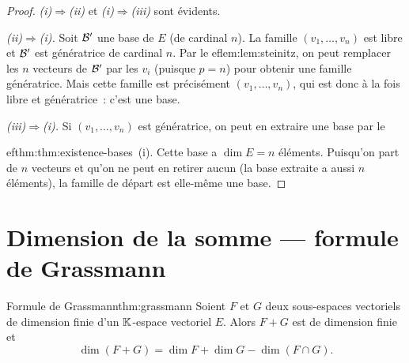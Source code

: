 \begin{proof}
  \emph{(i)$\Rightarrow$(ii)} et \emph{(i)$\Rightarrow$(iii)} sont
  évidents.

  \emph{(ii)$\Rightarrow$(i).} Soit ${\mathcal{B}}'$ une base de $E$ (de
  cardinal $n$). La famille $(v_1,\ldots,v_n)$ est libre et ${\mathcal{B}}'$
  est génératrice de cardinal $n$. Par le 
ef{lem:lem:steinitz}, on
  peut remplacer les $n$ vecteurs de ${\mathcal{B}}'$ par les $v_i$ (puisque
  $p=n$) pour obtenir une famille génératrice. Mais cette famille
  est précisément $(v_1,\ldots,v_n)$, qui est donc à la fois libre
  et génératrice~: c'est une base.

  \emph{(iii)$\Rightarrow$(i).} Si $(v_1,\ldots,v_n)$ est
  génératrice, on peut en extraire une base par le
  
ef{thm:thm:existence-bases}~(i). Cette base a $\dim E=n$ éléments.
  Puisqu'on part de $n$ vecteurs et qu'on ne peut en retirer aucun
  (la base extraite a aussi $n$ éléments), la famille de départ est
  elle-même une base.
\end{proof}

\section{Dimension de la somme --- formule de Grassmann}\label{sec:grassmann}

\begin{theorem}{Formule de Grassmann}{thm:grassmann}
  Soient $F$ et $G$ deux sous-espaces vectoriels de dimension finie
  d'un ${\mathbb{K}}$-espace vectoriel $E$. Alors $F+G$ est de dimension finie et
  \[
    \dim(F+G) = \dim F + \dim G - \dim(F\cap G).
  \]
\end{theorem}

